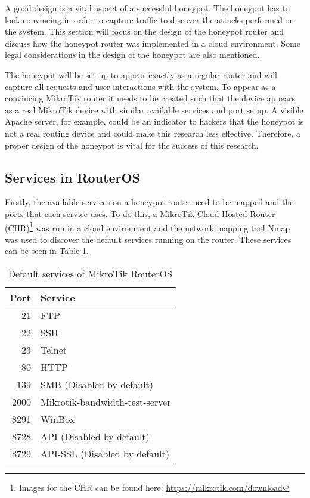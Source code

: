 A good design is a vital aspect of a successful honeypot. The honeypot has to look convincing in order to capture traffic to discover the attacks performed on the system. This section will focus on the design of the honeypot router and discuss how the honeypot router was implemented in a cloud environment. Some legal considerations in the design of the honeypot are also mentioned. 

The honeypot will be set up to appear exactly as a regular router and will capture all requests and user interactions with the system. To appear as a convincing MikroTik router it needs to be created such that the device appears as a real MikroTik device with similar available services and port setup. A visible Apache server, for example, could be an indicator to hackers that the honeypot is not a real routing device and could make this research less effective. Therefore, a proper design of the honeypot is vital for the success of this research. 

\subsection{Services in RouterOS}
Firstly, the available services on a honeypot router need to be mapped and the ports that each service uses. To do this, a MikroTik Cloud Hosted Router (CHR)\footnote{Images for the CHR can be found here: \url{https://mikrotik.com/download}} was run in a cloud environment and the network mapping tool Nmap was used to discover the default services running on the router. These services can be seen in Table \ref{table:miktorik_defailt_ports}.
\begin{table}[h]
\centering 
\begin{tabular}{ |r|l| } 
\hline
Port & Service \\ \hline
21 & FTP \\ \hline
22 & SSH \\ \hline
23 & Telnet \\ \hline
80 & HTTP \\ \hline
139 & SMB (Disabled by default) \\ \hline
2000 & Mikrotik-bandwidth-test-server \\ \hline
8291 & WinBox \\ \hline
8728 & API (Disabled by default) \\ \hline
8729 & API-SSL (Disabled by default) \\ \hline
\end{tabular}
\caption{Default services of MikroTik RouterOS}
\label{table:miktorik_defailt_ports}
\end{table}

